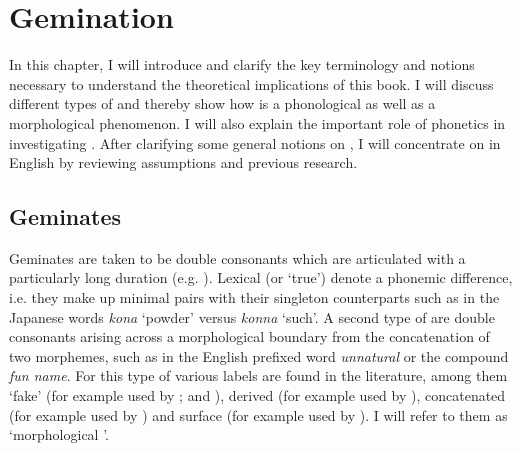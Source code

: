 \chapter{Gemination} \label{Gemination}


In this chapter, I will introduce and clarify the key terminology and notions necessary to understand the theoretical implications of this book. I will discuss different types of  and thereby show how  is a phonological as well as a morphological phenomenon. I will also explain the important role of phonetics in investigating . After clarifying some general notions on , I will concentrate on  in English by reviewing assumptions and previous research. 

\section{Geminates} \label{what is gemination}

Geminates are taken to be double consonants which are articulated with a particularly long duration (e.g. \citealt{Hartmann.1972, Catford.1988, Trask.1996, Matthews.1997, Crystal.2008,Davis.2011, Galea.2016}). Lexical (or `true')  denote a phonemic difference, i.e. they make up minimal pairs with their singleton counterparts such as in the Japanese words  \textit{kona} ‘powder’ versus \textit{konna} ‘such'. A second type of  are double consonants arising across a morphological boundary from the concatenation of two morphemes, such as in the English prefixed word \textit{unnatural} or the compound \textit{fun name}. For this type of  various labels are found in the literature, among them `fake'  (for example used by \citealt{Hayes.1986b}; \citealt{Oh.2012} and \citealt{Kotzor.2016}), derived  (for example used by \citealt{Kubozono.2017b}), concatenated  (for example used by \citealt{Ridouane.2010}) and surface  (for example used by \citealt{Lahiri.1988, Galea.2016}). I will refer to them as ‘morphological '.


